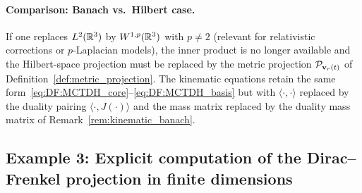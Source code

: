 \begin{example}
\paragraph{Comparison: Banach vs.\ Hilbert case.}
If one replaces $L^2(\mathbb{R}^3)$ by $W^{1,p}(\mathbb{R}^3)$ with $p \neq 2$
(relevant for relativistic corrections or $p$-Laplacian models),
the inner product is no longer available and the Hilbert-space projection
must be replaced by the metric projection $\mathcal{P}_{\mathbf{v}_r(t)}$ of
Definition~\ref{def:metric_projection}. The kinematic equations retain
the same form~\eqref{eq:DF:MCTDH_core}--\eqref{eq:DF:MCTDH_basis}
but with $\langle \cdot, \cdot\rangle$ replaced by the duality pairing
$\langle \cdot, J(\cdot)\rangle$ and the mass matrix replaced by the
duality mass matrix of Remark~\ref{rem:kinematic_banach}.
\end{example}

\subsection*{Example 3: Explicit computation of the Dirac--Frenkel projection
in finite dimensions}


